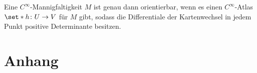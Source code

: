 \begin{korollarB}[{name=[{Orientierbarkeit im homologischen Sinne ist das gleiche wie im differentialtopologischen Sinne}]}]
	Eine $C^\infty$-Mannigfaltigkeit $M$ ist genau dann orientierbar, wenn es einen $C^\infty$-Atlas $\set*{h \colon U \to V}$ für $M$ gibt, sodass die Differentiale der Kartenwechsel in jedem Punkt positive Determinante besitzen.
\end{korollarB}


\cleardoubleoddemptypage
{}
\setcounter{page}{1}
\cleardoubleoddemptypage
\appendix

\section{Anhang} %
\label{sec:anhang}

\printindex
\printbibliography
\listoffigures
\todototoc
{}

